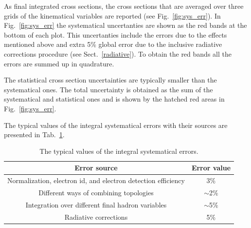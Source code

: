 As final integrated cross sections, the cross sections that are averaged over three grids of the kinematical variables are reported (see Fig.~\ref{fig:sys_err}). In Fig.~\ref{fig:sys_err} the systematical uncertanties are shown as the red bands at the bottom of each plot. This uncertanties include the errors due to the effects mentioned above and extra 5\% global error due to the inclusive radiative corrections procedure (see Sect.~\ref{radiative}). To obtain the red bands all the errors are summed up in quadrature.  

The statistical cross section uncertainties are typically smaller than the systematical ones. The total uncertainty is obtained as the sum of the systematical and statistical ones and is shown by the hatched red areas in Fig.~\ref{fig:sys_err}.
 
The typical values of the integral systematical errors with their sources are presented in Tab.~\ref{tab:sys_err}. 
 
\begin{table}[htp]
\centering 

\begin{tabular}{|c|c|}

\hline
Error source & Error value\\ \hline
Normalization, electron id, and
 electron detection efficiency & 3\% \\ \hline
Different ways of combining topologies & $\sim$2\%\\ \hline 
Integration over different final hadron variables & $\sim$5\%\\ \hline 
Radiative corrections & 5\% \\ \hline 
\end{tabular}
\caption{\small The typical values of the integral systematical errors. \label{tab:sys_err}}
\end{table}  

